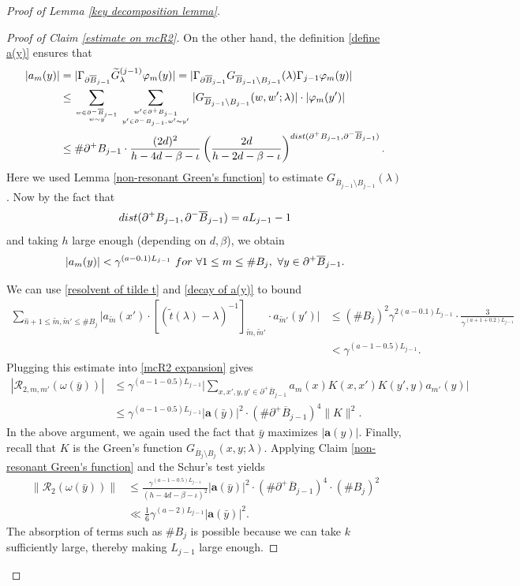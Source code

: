 \documentclass[10pt,a4paper]{amsart}
\newcommand{\barB}{\overline{B}}
\newcommand{\bfa}{\mathbf{a}}
\newcommand{\dist}{{\rm dist}}
\newcommand{\mcR}{\mathcal{R}}
\newcommand{\tm}{\widetilde{m}}
\newcommand{\whn}{\widehat{n}}
\newcommand{\wtGjminusone}{\widetilde{G}^{(j-1)}}
\renewcommand{\tt}{\tilde{t}}
\begin{document}
\begin{proof}[Proof of Lemma \ref{key decomposition lemma}]
\begin{proof}[Proof of Claim \ref{estimate on mcR2}]
  On the other hand, the definition \eqref{define a(y)} ensures that 
  \begin{align*}
    |a_m(y)| & = |\Gamma_{\partial \barB_{j-1}}  \wtGjminusone_{\lambda} \varphi_m (y)| =| \Gamma_{\partial \barB_{j-1}} G_{\barB_{j-1}\setminus B_{j-1}}(\lambda)  \Gamma_{j-1} \varphi_m(y)| \\
       & \leq \sum_{w\in \partial^{-}\barB_{j-1} \atop  w\sim y} \sum_{w'\in \partial^+ B_{j-1} \atop y'\in \partial^-B_{j-1} , w' \sim y'}  |G_{\barB_{j-1}\setminus B_{j-1}}(w,w';\lambda)|\cdot |\varphi_m(y')| \\ 
       &\leq \#\partial^+ B_{j-1} \cdot \frac{(2d)^2}{h-4d-\beta-\iota} \left(\frac{2d}{h-2d-\beta-\iota}\right)^{\dist(\partial^+B_{j-1},\partial^-\barB_{j-1})}.
  \end{align*}
  Here we used Lemma \ref{non-resonant Green's function} to estimate $G_{\barB_{j-1}\setminus B_{j-1}}(\lambda)$. Now by the fact that  
  \[\dist(\partial^+B_{j-1},\partial^-\barB_{j-1}) =aL_{j-1}-1\]
  and taking $h$ large enough (depending on $d,\beta$), we obtain 
  \begin{equation}\label{decay of a(y)}
    |a_m(y)|<\gamma^{(a-0.1)L_{j-1}}\  {\rm for}\ \forall 1\leq m\leq \#B_j,\  \forall y\in \partial^+\barB_{j-1}.
  \end{equation}

  We can use \eqref{resolvent of tilde t} and \eqref{decay of a(y)} to bound 
  \begin{align*}
    \sum_{ \whn+1\leq \tm,\tm'\leq  \# B_j }  \bigg|a_{\tm}(x')\cdot [(\tt(\lambda)-\lambda)^{-1}]_{\tm,\tm'}\cdot a_{\tm'}(y')\bigg|& \leq  (\# B_j)^2 \gamma^{2(a-0.1)L_{j-1}} \cdot \frac{3}{\gamma^{(a+1+0.2)L_{j-1}}} \\
      &< \gamma^{(a-1-0.5)L_{j-1}}.
  \end{align*}
  Plugging this estimate into \eqref{mcR2 expansion} gives  
  \begin{align*}
    |\mcR_{2,m,m'}(\omega(\bar{y}))| &\leq\gamma^{(a-1-0.5)L_{j-1}} \bigg| \sum_{x,x',y,y'\in \partial^+\barB_{j-1}} a_{m}(x)K(x,x')  K(y',y) a_{m'}(y) \bigg| \\
    &\leq \gamma^{(a-1-0.5)L_{j-1}} |\bfa(\bar{y})|^2 \cdot (\# \partial^+\barB_{j-1})^4 \|K\|^2.
  \end{align*}
  In the above argument,  we again used the fact that $\bar{y}$ maximizes $|\bfa(y)|$. Finally, recall that $K$ is the Green's function $G_{\barB_{j}\setminus B_j}(x,y;\lambda)$. Applying Claim \ref{non-resonant Green's function} and the Schur's test yields
  \begin{align*}
    \|\mcR_{2}(\omega(\bar{y}))\| & \leq \frac{\gamma^{(a-1-0.5)L_{j-1}} }{(h-4d-\beta-\iota)^2}|\bfa(\bar{y})|^2 \cdot (\# \partial^+\barB_{j-1})^4 \cdot (\# B_{j})^2 \\
       &\ll \frac{1}{6}\gamma^{(a-2)L_{j-1}} |\bfa(\bar{y})|^2.
  \end{align*}
The absorption of terms such as $\# B_{j}$ is possible because we can take $k$ sufficiently large, thereby making $L_{j-1}$ large enough.
\end{proof}



\end{proof}
\end{document}
